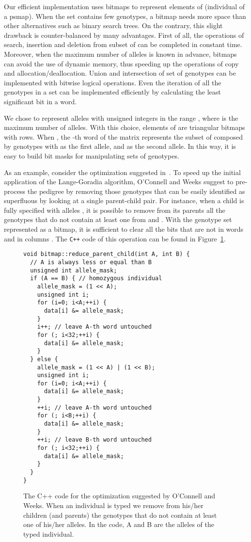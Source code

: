 Our efficient implementation uses bitmaps to represent elements of
 (individual of a psmap). When the set contains few
genotypes, a bitmap needs more space than other alternatives such as binary
search trees. On the contrary, this slight drawback is counter-balanced by many
advantages. First of all, the operations of search, insertion and deletion from
subset of  can be completed in constant time. Moreover, when the
maximum number of alleles is known in advance, bitmaps can avoid the use of
dynamic memory, thus speeding up the operations of copy and
allocation/deallocation.  Union and intersection of set of genotypes can be
implemented with bitwise logical operations.  Even the iteration of all the
genotypes in a set can be implemented efficiently by calculating the least
significant bit in a word. 

We chose to represent alleles with unsigned integers in the range ,
where  is the maximum number of alleles. With this choice, elements of
 are triangular bitmaps with  rows.  When , the
-th word of the matrix represents the subset of  composed by
genotypes with  as the first allele, and  as the second allele. In this
way, it is easy to build bit masks for manipulating sets of genotypes. 

As an example, consider the optimization suggested in~\cite{OConnellWeeks1999}. To
speed up the initial application of the Lange-Goradia algorithm, O'Connell and
Weeks suggest to pre-process the pedigree by removing those genotypes that can
be easily identified as superfluous by looking at a single parent-child pair. For
instance, when a child is fully specified with alleles , it is possible
to remove from its parents all the genotypes that do not contain at least one
from  and . With the genotype set represented as a bitmap, it is
sufficient to clear all the bits that are not in words  and in columns
. The \verb|C++| code of this operation can be found in Figure~\ref{fig:remove}.

\begin{figure}
  \centering
\begin{lstlisting}
void bitmap::reduce_parent_child(int A, int B) {
  // A is always less or equal than B
  unsigned int allele_mask;
  if (A == B) { // homozygous individual
    allele_mask = (1 << A);
    unsigned int i;
    for (i=0; i<A;++i) {
      data[i] &= allele_mask;
    }
    i++; // leave A-th word untouched
    for (; i<32;++i) {
      data[i] &= allele_mask;
    }
  } else {
    allele_mask = (1 << A) | (1 << B); 
    unsigned int i;
    for (i=0; i<A;++i) {
      data[i] &= allele_mask;
    }
    ++i; // leave A-th word untouched
    for (; i<B;++i) {
      data[i] &= allele_mask;
    }
    ++i; // leave B-th word untouched
    for (; i<32;++i) {
      data[i] &= allele_mask;
    }
  }  
}
\end{lstlisting}  
  \caption{The C++ code for the optimization suggested by O'Connell and
    Weeks. When an individual is typed we remove from his/her children (and parents) the
    genotypes that do not contain at least one of his/her alleles. In the code,
    A and B are the alleles of the typed individual.}
  \label{fig:remove}
\end{figure}
  
